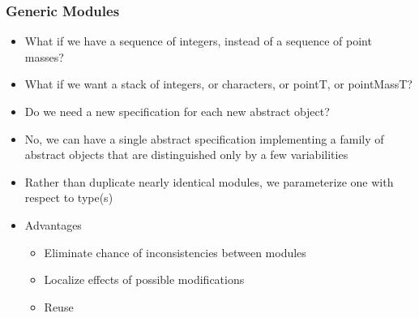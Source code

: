 \documentclass[t,12pt,numbers,fleqn]{beamer}
\begin{document}


\begin{frame}
\frametitle{Generic Modules}

\begin{itemize}
\item What if we have a sequence of integers, instead of a sequence of point masses?
\item What if we want a stack of integers, or characters, or pointT, or pointMassT?
\item Do we need a new specification for each new abstract object?
\item No, we can have a single abstract specification implementing a family of abstract objects that are distinguished
only by a few variabilities
\item Rather than duplicate nearly identical modules, we parameterize one  with respect to
type(s)
\item Advantages
\begin{itemize}
\item Eliminate chance of inconsistencies between modules
\item Localize effects of possible modifications
\item Reuse
\end{itemize}
\end{itemize}

\end{frame}
\end{document}

